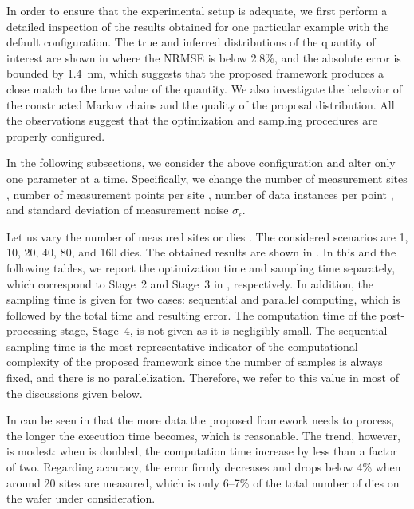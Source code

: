 In order to ensure that the experimental setup is adequate, we first perform a
detailed inspection of the results obtained for one particular example with the
default configuration. The true and inferred distributions of the quantity of
interest are shown in  where the \ac{NRMSE}
is below 2.8\%, and the absolute error is bounded by 1.4~nm, which suggests that
the proposed framework produces a close match to the true value of the quantity.
We also investigate the behavior of the constructed Markov chains and the
quality of the proposal distribution. All the observations suggest that the
optimization and sampling procedures are properly configured.

In the following subsections, we consider the above configuration and alter only
one parameter at a time. Specifically, we change the number of measurement sites
\hnd, number of measurement points per site \np, number of data instances per
point \ns, and standard deviation of measurement noise $\sigma_\epsilon$.


Let us vary the number of measured sites or dies \hnd. The considered scenarios
are 1, 10, 20, 40, 80, and 160 dies. The obtained results are shown in
. In this and the following tables, we report the optimization
time and sampling time separately, which correspond to Stage~2 and Stage~3 in
, respectively. In addition, the sampling time is given for
two cases: sequential and parallel computing, which is followed by the total
time and resulting error. The computation time of the post-processing stage,
Stage~4, is not given as it is negligibly small. The sequential sampling time is
the most representative indicator of the computational complexity of the
proposed framework since the number of samples is always fixed, and there is no
parallelization. Therefore, we refer to this value in most of the discussions
given below.

In can be seen in  that the more data the proposed framework
needs to process, the longer the execution time becomes, which is reasonable.
The trend, however, is modest: when \hnd is doubled, the computation time
increase by less than a factor of two. Regarding accuracy, the error firmly
decreases and drops below 4\% when around 20 sites are measured, which is only
6--7\% of the total number of dies on the wafer under consideration.

